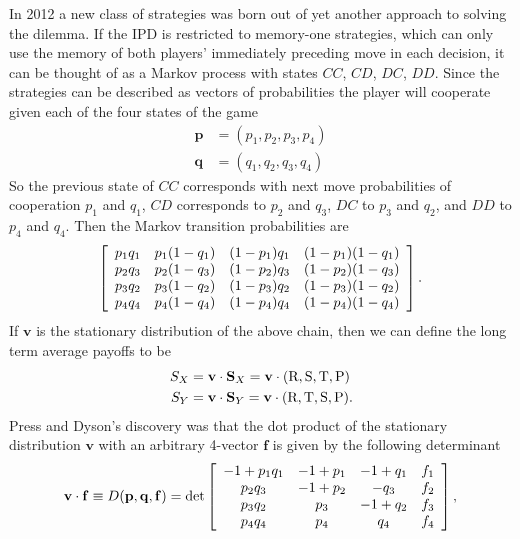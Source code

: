 In 2012 a new class of strategies was born out of yet another approach to solving the dilemma. If the IPD is restricted to memory-one strategies, which can only use the memory of both players' immediately preceding move in each decision, it can be thought of as a Markov process with states $CC$, $CD$, $DC$, $DD$. Since the strategies can be described as vectors of probabilities the player will cooperate given each of the four states of the game
\begin{align*}
\mathbf{p} &= (p_1, p_2, p_3, p_4) \\
\mathbf{q} &= (q_1, q_2, q_3, q_4)
\end{align*}
So the previous state of $CC$ corresponds with next move probabilities of cooperation $p_1$ and $q_1$, $CD$ corresponds to $p_2$ and $q_3$, $DC$ to $p_3$ and $q_2$, and $DD$ to $p_4$ and $q_4$. 
Then the Markov transition probabilities are
\[
\left[
\begin{array}{c c c c}
p_1q_1 & p_1 (1-q_1) & (1-p_1)q_1 & (1-p_1)(1-q_1) \\
p_2q_3 & p_2 (1-q_3) & (1-p_2)q_3 & (1-p_2)(1-q_3) \\
p_3q_2 & p_3 (1-q_2) & (1-p_3)q_2 & (1-p_3)(1-q_2) \\
p_4q_4 & p_4 (1-q_4) & (1-p_4)q_4 & (1-p_4)(1-q_4)
\end{array}
\right]
.\]
If $\mathbf{v}$ is the stationary distribution of the above chain, then we can define the long term average payoffs to be
\begin{align*}
S_X &= \mathbf{v} \cdot \mathbf{S}_X = \mathbf{v} \cdot (\textrm{R}, \textrm{S}, \textrm{T}, \textrm{P}) \\
S_Y &= \mathbf{v} \cdot \mathbf{S}_Y = \mathbf{v} \cdot (\textrm{R}, \textrm{T}, \textrm{S}, \textrm{P}).
\end{align*}
Press and Dyson's discovery was that the dot product of the stationary distribution $\mathbf{v}$ with an arbitrary 4-vector $\mathbf{f}$ is given by the following determinant
\[
\mathbf{v}\cdot \mathbf{f} \equiv D(\mathbf{p}, \mathbf{q}, \mathbf{f})
= \det
\left[
\begin{array}{c c c c}
-1 + p_1 q_1    &	-1 + p_1	&	-1 + q_1	&	f_1 \\
p_2 q_3         &	-1 + p_2	&	-q_3		&	f_2 \\
p_3 q_2 		&	p_3			&	-1 + q_2	&	f_3 \\
p_4 q_4			&	p_4			&	q_4			&	f_4
\end{array}
\right],
\]
